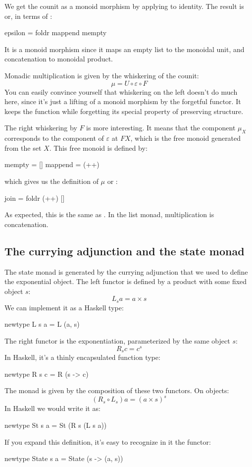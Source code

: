 \documentclass[DaoFP]{subfiles}
\begin{document}
We get the counit as a monoid morphism  by applying  to identity. The result is  or, in terms of :
\begin{haskell}
epsilon = foldr mappend mempty
\end{haskell}
It is a monoid morphism since it maps an empty list to the monoidal unit, and concatenation to monoidal product.

Monadic multiplication is given by the whiskering of the counit:
\[ \mu = U \circ \varepsilon \circ F \]
You can easily convince yourself that whiskering on the left doesn't do much here, since it's just a lifting of a monoid morphism by the forgetful functor. It keeps the function while forgetting its special property of preserving structure. 

The right whiskering by $F$ is more interesting. It means that the component $\mu_X$ corresponds to the component of $\varepsilon$ at $F X$, which is the free monoid generated from the set $X$. This  free monoid is defined by:
\begin{haskell}
mempty = []
mappend = (++)
\end{haskell}
which gives us the definition of $\mu$ or :
\begin{haskell}
join = foldr (++) []
\end{haskell}
As expected, this is the same as . In the list monad, multiplication is concatenation.

\subsection{The currying adjunction and the state monad}

The state monad is generated by the currying adjunction that we used to define the exponential object. The left functor is defined by a product with some fixed object $s$:
\[ L_s a = a \times s \]
We can implement it as a Haskell type:
\begin{haskell}
newtype L s a = L (a, s)
\end{haskell}
The right functor is the exponentiation, parameterized by the same object $s$:
\[ R_s c = c^s \]
In Haskell, it's a thinly encapsulated function type:
\begin{haskell}
newtype R s c = R (s -> c)
\end{haskell}

The monad is given by the composition of these two functors. On objects:
\[(R_s \circ L_s) a = (a \times s)^s \]
In Haskell we would write it as:
\begin{haskell}
newtype St s a = St (R s (L s a))
\end{haskell}
If you expand this definition, it's easy to recognize in it the  functor:
\begin{haskell}
newtype State s a = State (s -> (a, s))
\end{haskell}
\end{document}
